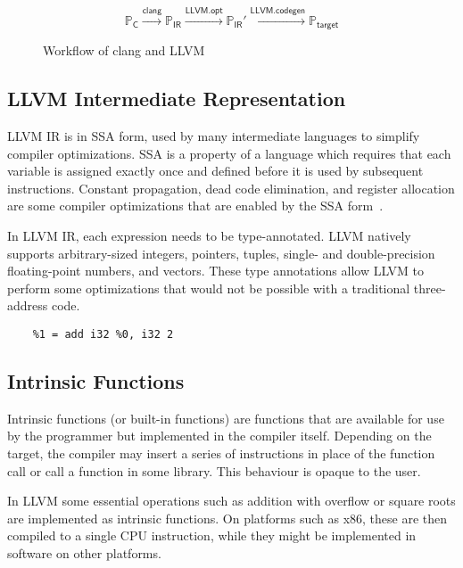 \begin{figure}[htpb]
    \begin{equation}
        \mathbb{P}_{\mathsf{C}}
        \xrightarrow{\mathsf{clang}} \mathbb{P}_\mathsf{IR}
        \xrightarrow{\mathsf{LLVM.opt}} \mathbb{P}_\mathsf{IR}'
        \xrightarrow{\mathsf{LLVM.codegen}} \mathbb{P}_\mathsf{target}
    \end{equation}
    \label{fig:llvm-clang-workflow}
    \caption{Workflow of clang and LLVM}
\end{figure}

\subsection{LLVM Intermediate Representation}\label{subsec:llvm-intermediate-representation}

LLVM \gls{IR} is in \gls{SSA} form, used by many intermediate languages to simplify compiler optimizations.
\gls{SSA} is a property of a language which requires that each variable is assigned exactly once and defined before it is used by subsequent instructions.
Constant propagation, dead code elimination, and register allocation are some compiler optimizations that are enabled by the \gls{SSA} form~\parencite{ssa}.

In LLVM IR, each expression needs to be type-annotated. LLVM natively supports arbitrary-sized integers, pointers, tuples, single- and double-precision floating-point numbers, and vectors.
These type annotations allow LLVM to perform some optimizations that would not be possible with a traditional three-address code.

\begin{lstlisting}[label={lst:llvm-ir},caption={Example of LLVM IR addding 5 + 2},captionpos=b]
    %0 = i32 5
    %1 = add i32 %0, i32 2
\end{lstlisting}

\subsection{Intrinsic Functions}

Intrinsic functions (or built-in functions) are functions that are available for use by the programmer but implemented in the compiler itself.
Depending on the target, the compiler may insert a series of instructions in place of the function call or call a function in some library.
This behaviour is opaque to the user.

In LLVM some essential operations such as addition with overflow or square roots are implemented as intrinsic functions.
On platforms such as x86, these are then compiled to a single CPU instruction, while they might be implemented in software on other platforms.


